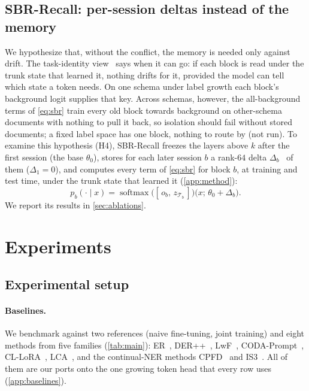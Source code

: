 \documentclass[10pt,twocolumn,letterpaper]{article}
\begin{document}
\subsection{SBR-Recall: per-session deltas instead of the memory}
\label{sec:recall}
We hypothesize that, without the conflict, the memory is needed only against drift. The task-identity view~\citep{kim2022theoretical} says when it can go: if each block is read under the trunk state that learned it, nothing drifts for it, provided the model can tell which state a token needs. On one schema under label growth each block's background logit supplies that key. Across schemas, however, the all-background terms of \cref{eq:sbr} train every old block towards background on other-schema documents with nothing to pull it back, so isolation should fail without stored documents; a fixed label space has one block, nothing to route by (not run). To examine this hypothesis (H4), SBR-Recall freezes the layers above $k$ after the first session (the base $\theta_0$), stores for each later session $b$ a rank-$64$ delta $\Delta_b$~\citep{hu2022lora} of them ($\Delta_1{=}0$), and computes every term of \cref{eq:sbr} for block $b$, at training and test time, under the trunk state that learned it (\cref{app:method}):
\begin{equation}
p_b(\cdot\mid x)=\operatorname{softmax}\big([\,o_b,\,z_{\mathcal{T}_b}\,]\big)\big(x;\,\theta_0+\Delta_b\big).
\label{eq:recall}
\end{equation}
We report its results in \cref{sec:ablations}.

\section{Experiments}
\label{sec:experiments}
\subsection{Experimental setup}
\paragraph{Baselines.} We benchmark against two references (naive fine-tuning, joint training) and eight methods from five families (\cref{tab:main}): ER~\citep{rolnick2019er}, DER++~\citep{buzzega2020der}, LwF~\citep{li2017lwf}, CODA-Prompt~\citep{smith2023coda}, CL-LoRA~\citep{he2025cllora}, LCA~\citep{lca2026}, and the continual-NER methods CPFD~\citep{zhang2023cpfd} and IS3~\citep{qiu2024is3}. All of them are our ports onto the one growing token head that every row uses (\cref{app:baselines}).
\end{document}
